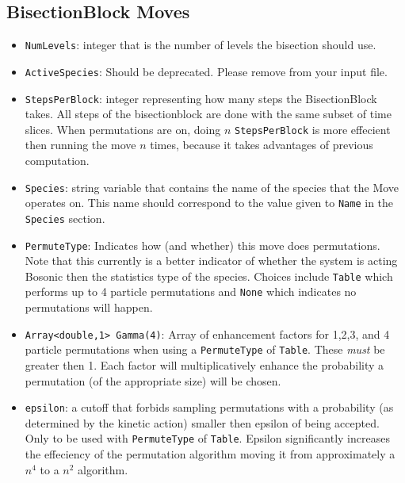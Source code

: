 \documentclass{book}
\begin{document}
\subsection{BisectionBlock Moves}
 
\begin{itemize}

  \item \texttt{NumLevels}: integer that is the number of levels the
  bisection should use.
   
  \item \texttt{ActiveSpecies}: Should be deprecated. Please remove
  from your input file. 

  \item \texttt{StepsPerBlock}: integer representing how many steps
  the BisectionBlock takes.  All steps of the bisectionblock are done
  with the same subset of time slices.  When permutations are on, doing $n$
  \texttt{StepsPerBlock} is more effecient then running the move $n$
  times, because it takes advantages of previous computation.  

  
   \item \texttt{Species}: string variable that contains the name of
   the species that the Move operates on.  This name should correspond
   to the value given to \texttt{Name} in the \texttt{Species}
   section.


   \item \texttt{PermuteType}: Indicates how (and whether) this move
   does permutations.  Note that this currently is a better indicator
   of whether the system is acting Bosonic then the statistics type of
   the species.  Choices include \texttt{Table} which performs up to 4
   particle permutations and \texttt{None} which indicates no
   permutations will happen.

   \item \texttt{Array<double,1> Gamma(4)}: Array of enhancement
     factors for 1,2,3, and 4 particle
     permutations when using a \texttt{PermuteType} of \texttt{Table}.
     These {\em must} be greater then 1.  Each factor will
     multiplicatively enhance the
     probability a permutation (of the appropriate size) will be chosen.
     
   \item \texttt{epsilon}: a cutoff that forbids sampling permutations with
     a probability (as determined by the kinetic action) smaller then epsilon 
     of being accepted.  Only to be used with \texttt{PermuteType} of
     \texttt{Table}. Epsilon significantly increases the 
     effeciency of the permutation algorithm moving it from
     approximately a $n^4$ to a $n^2$ algorithm. 

\end{itemize}
\end{document}
